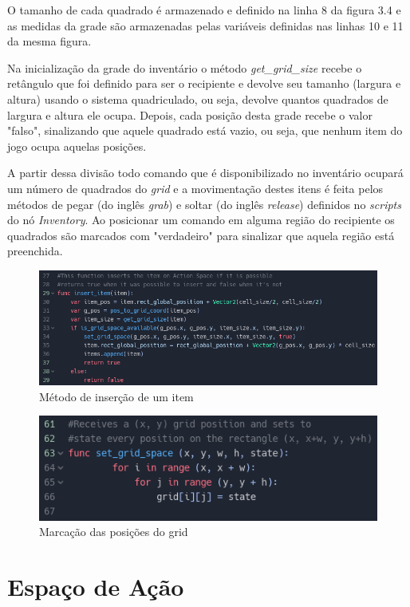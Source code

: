 O tamanho de cada quadrado é armazenado e definido na linha 8 da figura 3.4
e as medidas da grade são armazenadas pelas variáveis definidas nas linhas
10 e 11 da mesma figura.

Na inicialização da grade do inventário o método \textit{get\_grid\_size} 
recebe o retângulo que foi definido para ser o recipiente e devolve seu 
tamanho (largura e altura) usando o sistema quadriculado, ou seja, devolve 
quantos quadrados de largura e altura ele ocupa. Depois, cada posição 
desta grade recebe o valor "falso", sinalizando que aquele quadrado está vazio,
ou seja, que nenhum item do jogo ocupa aquelas posições.

A partir dessa divisão todo comando que é disponibilizado no inventário ocupará
um número de quadrados do \textit{grid} e a movimentação destes itens é feita 
pelos métodos de pegar (do inglês \textit{grab}) e soltar (do inglês 
\textit{release}) definidos no \textit{scripts} do nó \textit{Inventory}. Ao
posicionar um comando em alguma região do recipiente os quadrados são marcados
com "verdadeiro" para sinalizar que aquela região está preenchida.

\begin{figure}[H]
    \includegraphics[scale=0.6]{../figuras/insere_item.png}
    \caption{Método de inserção de um item}
\end{figure}

\begin{figure}[H]
    \includegraphics[scale=0.7]{../figuras/marca_grid.png}
    \caption{Marcação das posições do grid}
\end{figure}

\section{Espaço de Ação}

